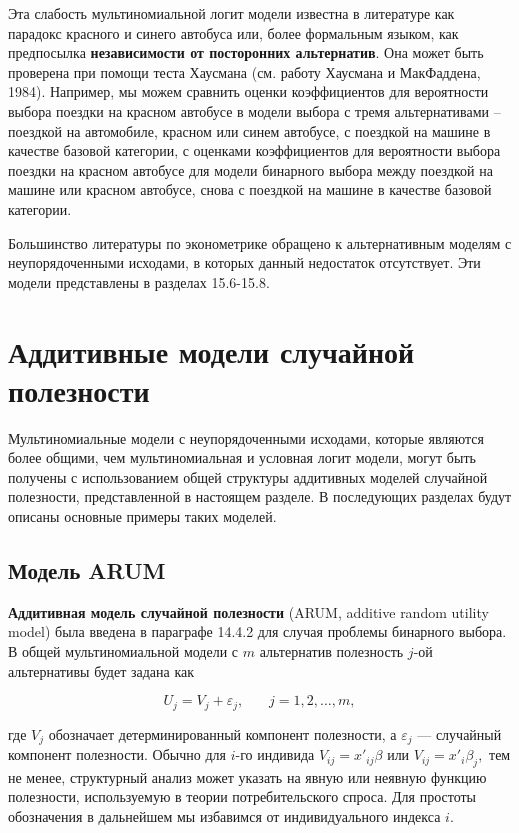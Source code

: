 Эта слабость мультиномиальной логит модели известна в литературе как парадокс красного и синего автобуса или, более формальным языком, как предпосылка \textbf{независимости от посторонних альтернатив}. Она может быть проверена при помощи теста Хаусмана (см. работу Хаусмана и МакФаддена, 1984). Например, мы можем сравнить оценки коэффициентов для вероятности выбора поездки на красном автобусе в модели выбора с тремя альтернативами -- поездкой на автомобиле, красном или синем автобусе, с поездкой на машине в качестве базовой категории, с оценками коэффициентов для вероятности выбора поездки на красном автобусе для модели бинарного выбора между поездкой на машине или красном автобусе, снова с поездкой на машине в качестве базовой категории.

Большинство литературы по эконометрике обращено к альтернативным моделям с неупорядоченными исходами, в которых данный недостаток отсутствует. Эти модели представлены в разделах 15.6-15.8.

\section{Аддитивные модели случайной полезности}

Мультиномиальные модели с неупорядоченными исходами, которые являются более общими, чем мультиномиальная и условная логит модели, могут быть получены с использованием общей структуры аддитивных моделей случайной полезности, представленной в настоящем разделе. В последующих разделах будут описаны основные примеры таких моделей.

\subsection{Модель ARUM}

\textbf{Аддитивная модель случайной полезности} (ARUM, additive random utility model) была введена в параграфе 14.4.2 для случая проблемы бинарного выбора. В общей мультиномиальной модели с $m$ альтернатив полезность $j$-ой альтернативы будет задана как

\begin{equation} \label{GrindEQ__15_22_} U_j=V_j+{\varepsilon }_j,\ \ \ \ \ \ \ \ j=1,2,\dots ,m, \end{equation} 

где $V_j$ обозначает детерминированный компонент полезности, а ${\varepsilon }_j$ --- случайный компонент полезности. Обычно для $i$-го индивида $V_{ij}=x'_{ij}\beta $ или $V_{ij}=x'_i{\beta }_j,$ тем не менее, структурный анализ может указать на явную или неявную функцию полезности, используемую в теории потребительского спроса. Для простоты обозначения в дальнейшем мы избавимся от индивидуального индекса $i$.

